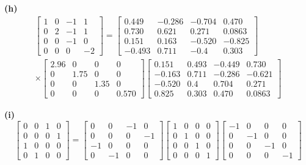 \begin{resolution}
  \vspace{12pt}
  {\bf (h)}\; \begin{multline*}\begin{bmatrix}
      1 & 0 & -1 & 1 \\ 0 & 2 & -1 & 1 \\ 0 & 0 & -1 & 0 \\ 0 & 0 & 0 & -2
    \end{bmatrix} = \begin{bmatrix}
      0.449  & -0.286 & -0.704 & 0.470  \\
      0.730  & 0.621  & 0.271  & 0.0863 \\
      0.151  & 0.163  & -0.520 & -0.825 \\
      -0.493 & 0.711  & -0.4   & 0.303
    \end{bmatrix} \\ \times \begin{bmatrix}
      2.96 & 0 & 0 & 0 \\ 0 & 1.75 & 0 & 0 \\ 0 & 0 & 1.35 & 0 \\ 0 & 0 & 0 & 0.570
    \end{bmatrix}  \begin{bmatrix}
      0.151  & 0.493 & -0.449 & 0.730 \\ -0.163 & 0.711 & -0.286 & -0.621 \\
      -0.520 & 0.4   & 0.704  & 0.271 \\ 0.825 & 0.303 & 0.470 & 0.0863
    \end{bmatrix}\end{multline*}

  \vspace{12pt}
  {\bf (i)}\; \begin{equation*}\begin{bmatrix}
      0 & 0 & 1 & 0 \\ 0 & 0 & 0 & 1 \\ 1 & 0 & 0 & 0 \\ 0 & 1 & 0 & 0
    \end{bmatrix} = \begin{bmatrix}
      0  & 0  & -1 & 0  \\
      0  & 0  & 0  & -1 \\
      -1 & 0  & 0  & 0  \\
      0  & -1 & 0  & 0
    \end{bmatrix} \begin{bmatrix}
      1 & 0 & 0 & 0 \\ 0 & 1 & 0 & 0 \\ 0 & 0 & 1 & 0 \\ 0 & 0 & 0 & 1
    \end{bmatrix}  \begin{bmatrix}
      -1 & 0 & 0  & 0 \\ 0 & -1 & 0 & 0 \\
      0  & 0 & -1 & 0 \\ 0 & 0 & 0 & -1
    \end{bmatrix}\end{equation*}


\end{resolution}
